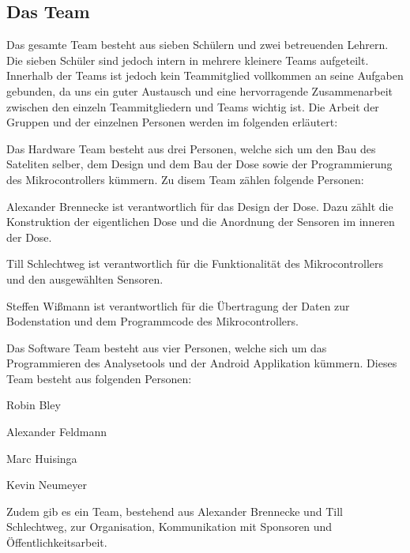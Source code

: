 \subsection{Das Team}

Das gesamte Team besteht aus sieben Schülern und zwei betreuenden Lehrern. Die sieben Schüler sind jedoch intern in mehrere kleinere Teams aufgeteilt. Innerhalb der Teams ist jedoch kein Teammitglied vollkommen an seine Aufgaben gebunden, da uns ein guter Austausch und eine hervorragende Zusammenarbeit zwischen den einzeln Teammitgliedern und Teams wichtig ist. Die Arbeit der Gruppen und der einzelnen Personen werden im folgenden erläutert:

Das Hardware Team besteht aus drei Personen, welche sich um den Bau des Sateliten selber, dem Design und dem Bau der Dose sowie der Programmierung des Mikrocontrollers kümmern. Zu disem Team zählen folgende Personen:

Alexander Brennecke ist verantwortlich für das Design der Dose. Dazu zählt die Konstruktion der eigentlichen Dose und die Anordnung der Sensoren im inneren der Dose.

Till Schlechtweg ist verantwortlich für die Funktionalität des Mikrocontrollers und den ausgewählten Sensoren.

Steffen Wißmann ist verantwortlich für die Übertragung der Daten zur Bodenstation und dem Programmcode des Mikrocontrollers.

Das Software Team besteht aus vier Personen, welche sich um das Programmieren des Analysetools und der Android Applikation kümmern. Dieses Team besteht aus folgenden Personen:

Robin Bley

Alexander Feldmann

Marc Huisinga

Kevin Neumeyer

Zudem gib es ein Team, bestehend aus Alexander Brennecke und Till Schlechtweg, zur Organisation, Kommunikation mit Sponsoren und Öffentlichkeitsarbeit.






